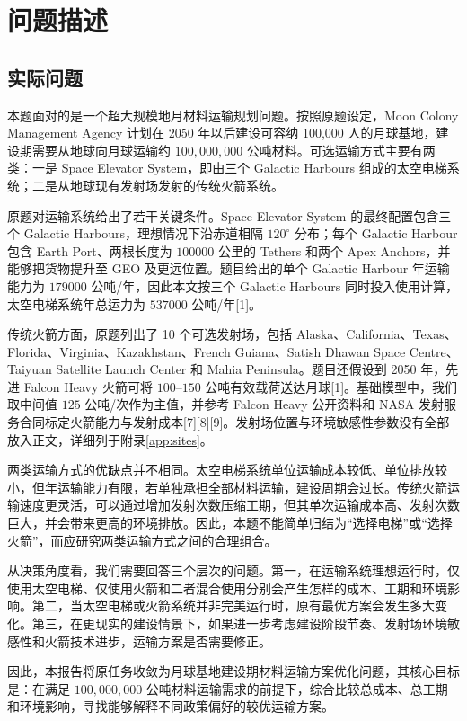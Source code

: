 \documentclass[12pt,a4paper,UTF8]{article}
\begin{document}
\clearpage
\section{问题描述}

\subsection{实际问题}

本题面对的是一个超大规模地月材料运输规划问题。按照原题设定，Moon Colony Management Agency 计划在 2050 年以后建设可容纳 100,000 人的月球基地，建设期需要从地球向月球运输约 \(100,000,000\) 公吨材料。可选运输方式主要有两类：一是 Space Elevator System，即由三个 Galactic Harbours 组成的太空电梯系统；二是从地球现有发射场发射的传统火箭系统。

原题对运输系统给出了若干关键条件。Space Elevator System 的最终配置包含三个 Galactic Harbours，理想情况下沿赤道相隔 \(120^\circ\) 分布；每个 Galactic Harbour 包含 Earth Port、两根长度为 \(100000\) 公里的 Tethers 和两个 Apex Anchors，并能够把货物提升至 GEO 及更远位置。题目给出的单个 Galactic Harbour 年运输能力为 \(179000\) 公吨/年，因此本文按三个 Galactic Harbours 同时投入使用计算，太空电梯系统年总运力为 \(537000\) 公吨/年[1]。

传统火箭方面，原题列出了 10 个可选发射场，包括 Alaska、California、Texas、Florida、Virginia、Kazakhstan、French Guiana、Satish Dhawan Space Centre、Taiyuan Satellite Launch Center 和 Mahia Peninsula。题目还假设到 2050 年，先进 Falcon Heavy 火箭可将 \(100\)--\(150\) 公吨有效载荷送达月球[1]。基础模型中，我们取中间值 \(125\) 公吨/次作为主值，并参考 Falcon Heavy 公开资料和 NASA 发射服务合同标定火箭能力与发射成本[7][8][9]。发射场位置与环境敏感性参数没有全部放入正文，详细列于附录\ref{app:sites}。

两类运输方式的优缺点并不相同。太空电梯系统单位运输成本较低、单位排放较小，但年运输能力有限，若单独承担全部材料运输，建设周期会过长。传统火箭运输速度更灵活，可以通过增加发射次数压缩工期，但其单次运输成本高、发射次数巨大，并会带来更高的环境排放。因此，本题不能简单归结为“选择电梯”或“选择火箭”，而应研究两类运输方式之间的合理组合。

从决策角度看，我们需要回答三个层次的问题。第一，在运输系统理想运行时，仅使用太空电梯、仅使用火箭和二者混合使用分别会产生怎样的成本、工期和环境影响。第二，当太空电梯或火箭系统并非完美运行时，原有最优方案会发生多大变化。第三，在更现实的建设情景下，如果进一步考虑建设阶段节奏、发射场环境敏感性和火箭技术进步，运输方案是否需要修正。

因此，本报告将原任务收敛为月球基地建设期材料运输方案优化问题，其核心目标是：在满足 \(100,000,000\) 公吨材料运输需求的前提下，综合比较总成本、总工期和环境影响，寻找能够解释不同政策偏好的较优运输方案。
\end{document}
